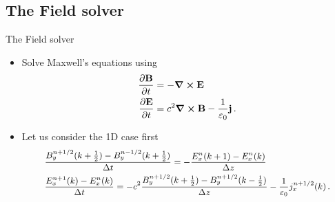 \documentclass{beamer}
\begin{document}
\subsection{The Field solver}

\begin{frame}{The Field solver}
	\begin{itemize}
		\item Solve Maxwell's equations using
		\begin{align*}
		  \pdv{\vb{B}}{t} & = - \curl{\vb{E}} \\
		  \pdv{\vb{E}}{t} & = c^2 \curl{\vb{B}} - \frac{1}{\varepsilon_0} \vb{j}\,.
		\end{align*}
		\item Let us consider the 1D case first
		\begin{subequations}%
			\small
		\begin{align*}
		    &\frac{B_y^{n+1/2}(k+\frac{1}{2}) - B_y^{n-1/2}(k+\frac{1}{2})}{\Delta t} =
		    - \frac{E_x^n(k+1) - E_x^n(k)}{\Delta z} \\
		    &\frac{E_x^{n+1}(k) - E_x^{n}(k)}{\Delta t} =
		    -c^2 \frac{B_y^{n+1/2}(k+\frac{1}{2}) - B_y^{n+1/2}(k-\frac{1}{2})}{\Delta z}
		    -\frac{1}{\varepsilon_0} j_x^{n+1/2}(k) \,.
		\end{align*}
		\end{subequations}
	\end{itemize}
\end{frame}
\end{document}
